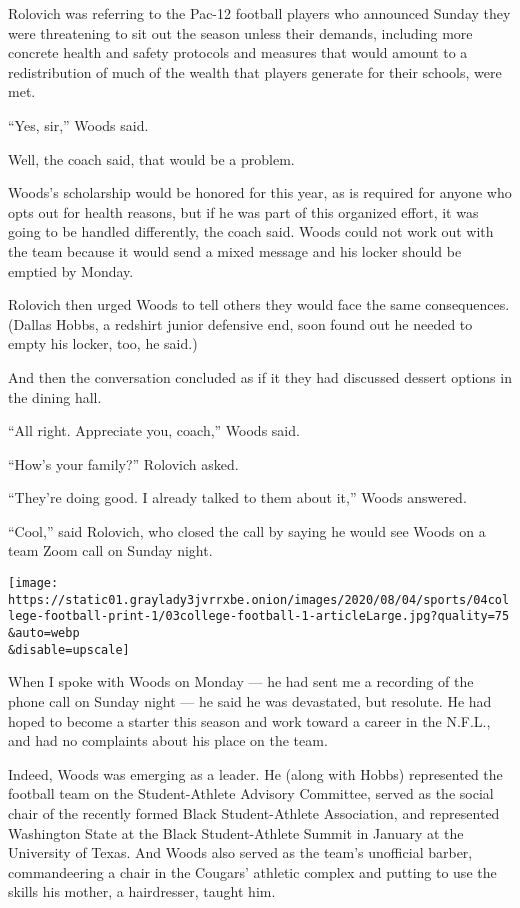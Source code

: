 Rolovich was referring to the Pac-12 football players who announced
Sunday they were threatening to sit out the season unless their demands,
including more concrete health and safety protocols and measures that
would amount to a redistribution of much of the wealth that players
generate for their schools, were met.

``Yes, sir,'' Woods said.

Well, the coach said, that would be a problem.

Woods's scholarship would be honored for this year, as is required for
anyone who opts out for health reasons, but if he was part of this
organized effort, it was going to be handled differently, the coach
said. Woods could not work out with the team because it would send a
mixed message and his locker should be emptied by Monday.

Rolovich then urged Woods to tell others they would face the same
consequences. (Dallas Hobbs, a redshirt junior defensive end, soon found
out he needed to empty his locker, too, he said.)

And then the conversation concluded as if it they had discussed dessert
options in the dining hall.

``All right. Appreciate you, coach,'' Woods said.

``How's your family?'' Rolovich asked.

``They're doing good. I already talked to them about it,'' Woods
answered.

``Cool,'' said Rolovich, who closed the call by saying he would see
Woods on a team Zoom call on Sunday night.

\texttt{[image: https://static01.graylady3jvrrxbe.onion/images/2020/08/04/sports/04college-football-print-1/03college-football-1-articleLarge.jpg?quality=75\\\&auto=webp\\\&disable=upscale]}

When I spoke with Woods on Monday --- he had sent me a recording of the
phone call on Sunday night --- he said he was devastated, but resolute.
He had hoped to become a starter this season and work toward a career in
the N.F.L., and had no complaints about his place on the team.

Indeed, Woods was emerging as a leader. He (along with Hobbs)
represented the football team on the Student-Athlete Advisory Committee,
served as the social chair of the recently formed Black Student-Athlete
Association, and represented Washington State at the Black
Student-Athlete Summit in January at the University of Texas. And Woods
also served as the team's unofficial barber, commandeering a chair in
the Cougars' athletic complex and putting to use the skills his mother,
a hairdresser, taught him.

